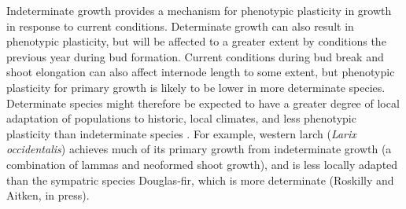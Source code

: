\documentclass{article}
\begin{document}
Indeterminate growth provides a mechanism for phenotypic plasticity in growth in response to current conditions. Determinate growth can also result in phenotypic plasticity, but will be affected to a greater extent by conditions the previous year during bud formation. Current conditions during bud break and shoot elongation can also affect internode length to some extent, but phenotypic plasticity for primary growth is likely to be lower in more determinate species. Determinate species might therefore be expected to have a greater degree of local adaptation of populations to historic, local climates, and less phenotypic plasticity than indeterminate species \citep{leitesForestTreeSpecies2023}. For example, western larch (\textit{Larix occidentalis}) achieves much of its primary growth from indeterminate growth (a combination of lammas and neoformed shoot growth), and is less locally adapted than the sympatric species Douglas-fir, which is more determinate (Roskilly and Aitken, in press).
	
\end{document}
